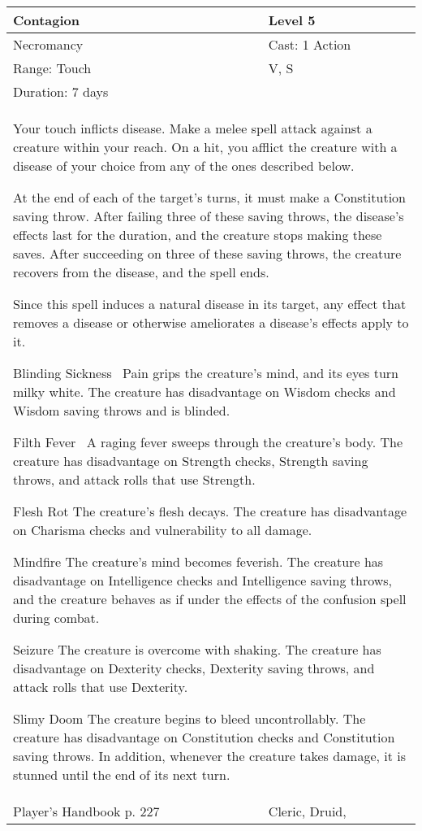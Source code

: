 \documentclass[11pt]{report}
\begin{document}
\begin{table}[H]
	\begin{tabular}{||p{6cm}|p{6cm}||}
		\hline\hline
		\bf{Contagion} & Level 5\\ \hline
		Necromancy & Cast: 1 Action\\ \hline
		Range: Touch & V, S\\ \hline
		Duration: 7 days & \\ \hline
		\multicolumn{2}{||p{12cm}||}{Your touch inflicts disease. 
Make a melee spell attack against a creature within your reach. On a hit, you afflict the creature with a disease of your choice from any of the ones described below. 

At the end of each of the target’s turns, it must make a Constitution saving throw. After failing three of these saving throws, the disease’s effects last for the duration, and the creature stops making these saves. After succeeding on three of these saving throws, the creature recovers from the disease, and the spell ends. 

Since this spell induces a natural disease in its target, any effect that removes a disease or otherwise ameliorates a disease’s effects apply to it. 

Blinding Sickness 
Pain grips the creature’s mind, and its eyes turn milky white. The creature has disadvantage on Wisdom checks and Wisdom saving throws and is blinded. 

Filth Fever 
A raging fever sweeps through the creature’s body. The creature has disadvantage on Strength checks, Strength saving throws, and attack rolls that use Strength. 

Flesh Rot
The creature’s flesh decays. The creature has disadvantage on Charisma checks and vulnerability to all damage. 

Mindfire 
The creature’s mind becomes feverish. The creature has disadvantage on Intelligence checks and Intelligence saving throws, and the creature behaves as if under the effects of the confusion spell during combat. 

Seizure 
The creature is overcome with shaking. The creature has disadvantage on Dexterity checks, Dexterity saving throws, and attack rolls that use Dexterity. 

Slimy Doom 
The creature begins to bleed uncontrollably. The creature has disadvantage on Constitution checks and Constitution saving throws. In addition, whenever the creature takes damage, it is stunned until the end of its next turn.}\\ \hline
Player's Handbook p. 227 & Cleric, Druid, \\ \hline\hline
	\end{tabular}
\end{table}
\end{document}
